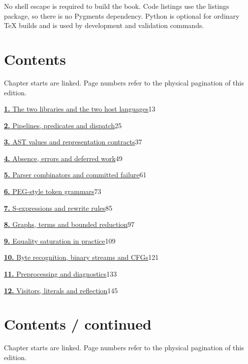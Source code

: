 No shell escape is required to build the book. Code listings use the listings package, so there is no Pygments dependency. Python is optional for ordinary TeX builds and is used by development and validation commands.

\clearpage
\section*{Contents}
Chapter starts are linked. Page numbers refer to the physical pagination of this edition.

\noindent\hyperref[ch:1]{\textbf{1.} The two libraries and the two host languages}\hfill 13\par\medskip
\noindent\hyperref[ch:2]{\textbf{2.} Pipelines, predicates and dispatch}\hfill 25\par\medskip
\noindent\hyperref[ch:3]{\textbf{3.} AST values and representation contracts}\hfill 37\par\medskip
\noindent\hyperref[ch:4]{\textbf{4.} Absence, errors and deferred work}\hfill 49\par\medskip
\noindent\hyperref[ch:5]{\textbf{5.} Parser combinators and committed failure}\hfill 61\par\medskip
\noindent\hyperref[ch:6]{\textbf{6.} PEG-style token grammars}\hfill 73\par\medskip
\noindent\hyperref[ch:7]{\textbf{7.} S-expressions and rewrite rules}\hfill 85\par\medskip
\noindent\hyperref[ch:8]{\textbf{8.} Graphs, terms and bounded reduction}\hfill 97\par\medskip
\noindent\hyperref[ch:9]{\textbf{9.} Equality saturation in practice}\hfill 109\par\medskip
\noindent\hyperref[ch:10]{\textbf{10.} Byte recognition, binary streams and CFGs}\hfill 121\par\medskip
\noindent\hyperref[ch:11]{\textbf{11.} Preprocessing and diagnostics}\hfill 133\par\medskip
\noindent\hyperref[ch:12]{\textbf{12.} Visitors, literals and reflection}\hfill 145\par\medskip
\clearpage
\section*{Contents / continued}
Chapter starts are linked. Page numbers refer to the physical pagination of this edition.

